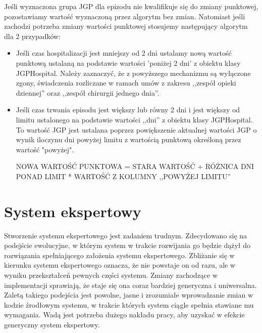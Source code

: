 Jeśli wyznaczona grupa JGP dla epizodu nie kwalifikuje się do zmiany punktowej, pozostawiamy wartość wyznaczoną przez algorytm bez zmian. Natomiast jeśli zachodzi potrzeba zmiany wartości punktowej stosujemy następujący algorytm dla 2 przypadków:
\begin{itemize}
\item Jeśli czas hospitalizacji jest mniejszy od 2 dni ustalamy nową wartość punktową ustalaną na podstawie wartości 'poniżej 2 dni' z obiektu klasy JGPHospital. Należy zaznaczyć, że z powyższego mechanizmu są wyłączone zgony, świadczenia rozliczane w ramach umów z zakresu ,,zespół opieki dziennej'' oraz ,,zespół chirurgii jednego dnia''.
\item Jeśli czas trwania episodu jest większy lub równy 2 dni i jest większy od limitu ustalonego na podstawie wartości ,,dni'' z obiektu klasy JGPHospital. To wartość JGP jest ustalana poprzez powiększenie aktualnej wartości JGP o wynik iloczynu dni powyżej limitu z wartością punktową określoną przez wartość "powyżej".

NOWA WARTOŚĆ PUNKTOWA = STARA WARTOŚĆ + RÓŻNICA DNI PONAD LIMIT * WARTOŚĆ Z KOLUMNY ,,POWYŻEJ LIMITU''
\end{itemize} 

\section{System ekspertowy}
\label{sec:systemEkspertowy}

Stworzenie systemu ekspertowego jest zadaniem trudnym\cite{mulawka_ekspertowe}. Zdecydowano się na podejście ewolucyjne, w którym system w trakcie rozwijania go będzie dążył do rozwiązania spełniającego założenia systemu ekspertowego. Zbliżanie się w kierunku systemu ekspertowego oznacza, że nie powstaje on od razu, ale w wyniku przekształceń pewnych części systemu. Zmiany zachodzące w implementacji sprawiają, że staje się ona coraz bardziej generyczna i uniwersalna. Zaletą takiego podejścia jest powolne, jasne i zrozumiałe wprowadzanie zmian w kodzie źrodłowym systemu, w trakcie których system ciągle spełnia stawiane mu wymagania. Wadą jest potrzeba dużego nakładu pracy, aby uzyskać w efekcie generyczny system ekspertowy\cite{zielonogorski_ekspertowe}.

